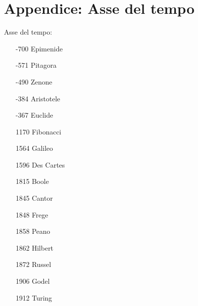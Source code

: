\documentclass[italian,a4paper,hidelinks,headinclude]{scrartcl}
\begin{document}
\section{Appendice: Asse del tempo}
Asse del tempo:
\begin{itemize}
\item[-700] Epimenide
\item[-571] Pitagora
\item[-490] Zenone
\item[-384] Aristotele
\item[-367] Euclide
\item[1170] Fibonacci
\item[1564] Galileo
\item[1596] Des Cartes
\item[1815] Boole
\item[1845] Cantor
\item[1848] Frege
\item[1858] Peano
\item[1862] Hilbert
\item[1872] Russel
\item[1906] Godel
\item[1912] Turing
\end{itemize}
\end{document}
